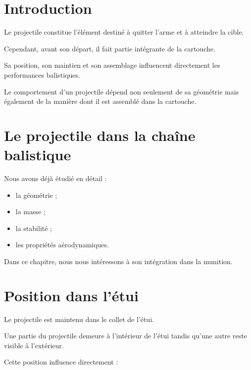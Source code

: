 
\section{Introduction}

Le projectile constitue l'élément destiné à quitter l'arme et à atteindre la
cible.

Cependant, avant son départ, il fait partie intégrante de la cartouche.

Sa position, son maintien et son assemblage influencent directement les
performances balistiques.

\begin{aretenir}

Le comportement d'un projectile dépend non seulement de sa géométrie mais
également de la manière dont il est assemblé dans la cartouche.

\end{aretenir}

\section{Le projectile dans la chaîne balistique}

Nous avons déjà étudié en détail :

\begin{itemize}
    \item la géométrie ;
    \item la masse ;
    \item la stabilité ;
    \item les propriétés aérodynamiques.
\end{itemize}

Dans ce chapitre, nous nous intéressons à son intégration dans la munition.

\section{Position dans l'étui}

Le projectile est maintenu dans le collet de l'étui.

Une partie du projectile demeure à l'intérieur de l'étui tandis qu'une autre
reste visible à l'extérieur.

Cette position influence directement :

